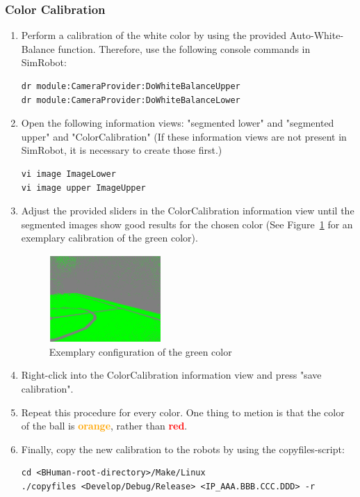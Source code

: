 \documentclass[a4paper]{article}
\begin{document}
\subsubsection{Color Calibration}
\begin{enumerate}
\item Perform a calibration of the white color by using the provided Auto-White-Balance function. Therefore, use the following console commands in SimRobot:
\begin{lstlisting}
dr module:CameraProvider:DoWhiteBalanceUpper
dr module:CameraProvider:DoWhiteBalanceLower
\end{lstlisting}
\item Open the following information views: "segmented lower" and "segmented upper" and "ColorCalibration" (If these information views are not present in SimRobot, it is necessary to create those first.)
\begin{lstlisting}
vi image ImageLower
vi image upper ImageUpper
\end{lstlisting}
\item Adjust the provided sliders in the ColorCalibration information view until the segmented images show good results for the chosen color (See Figure~\ref{fig:calGreen} for an exemplary calibration of the green color).

\begin{figure}
\centering
\includegraphics[width=0.4\textwidth]{pics/calGreen.PNG}
\caption{Exemplary configuration of the green color}
\label{fig:calGreen}
\end{figure}

\item Right-click into the ColorCalibration information view and press "save calibration".
\item Repeat this procedure for every color. One thing to metion is that the color of the ball is \textcolor{orange}{\textbf{orange}}, rather than \textcolor{red}{\textbf{red}}.
\item Finally, copy the new calibration to the robots by using the copyfiles-script:
\begin{lstlisting}
cd <BHuman-root-directory>/Make/Linux
./copyfiles <Develop/Debug/Release> <IP_AAA.BBB.CCC.DDD> -r
\end{lstlisting}
\end{enumerate}
\end{document}
